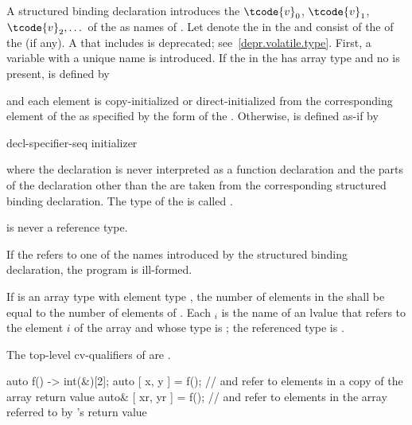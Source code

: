 \pnum
A structured binding declaration introduces the 
$\tcode{v}_0$, $\tcode{v}_1$, $\tcode{v}_2, \dotsc$
of the
 as names
of .
Let \cv{} denote the  in
the  and
 consist of the  of
the  (if any).
A \cv{} that includes  is deprecated;
see~\ref{depr.volatile.type}.
First, a variable with a unique name  is introduced. If the
 in the 
has array type  and no  is present,
 is defined by
\begin{ncbnf}
  \cv{}   \terminal{;}
\end{ncbnf}
and each element is copy-initialized or direct-initialized
from the corresponding element of the  as specified
by the form of the .
Otherwise, 
is defined as-if by
\begin{ncbnf}
 decl-specifier-seq   initializer \terminal{;}
\end{ncbnf}
where
the declaration is never interpreted as a function declaration and
the parts of the declaration other than the  are taken
from the corresponding structured binding declaration.
The type of the 
 is called .
\begin{note}
 is never a reference type.
\end{note}

\pnum
If the  refers to
one of the names introduced by the structured binding declaration,
the program is ill-formed.

\pnum
If  is an array type with element type , the number
of elements in the  shall be equal to the
number of elements of . Each $_i$ is the name of an
lvalue that refers to the element $i$ of the array and whose type
is ; the referenced type is .
\begin{note}
The top-level cv-qualifiers of  are \cv.
\end{note}
\begin{example}
\begin{codeblock}
auto f() -> int(&)[2];
auto [ x, y ] = f();            //  and  refer to elements in a copy of the array return value
auto& [ xr, yr ] = f();         //  and  refer to elements in the array referred to by 's return value
\end{codeblock}
\end{example}

